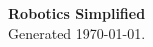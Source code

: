 \documentclass[12pt,twoside]{article}
\begin{document}

\sloppy

\begin{titlepage}
	\begin{center}
    \vspace*{2cm}
		\Huge \textbf{Robotics Simplified}\\
		\normalsize \vspace{0.5cm}
		Generated \today.
	\end{center}
\end{titlepage}

\cleardoublepage

\setcounter{page}{1}%

\tableofcontents

\cleardoublepage
\end{document}

